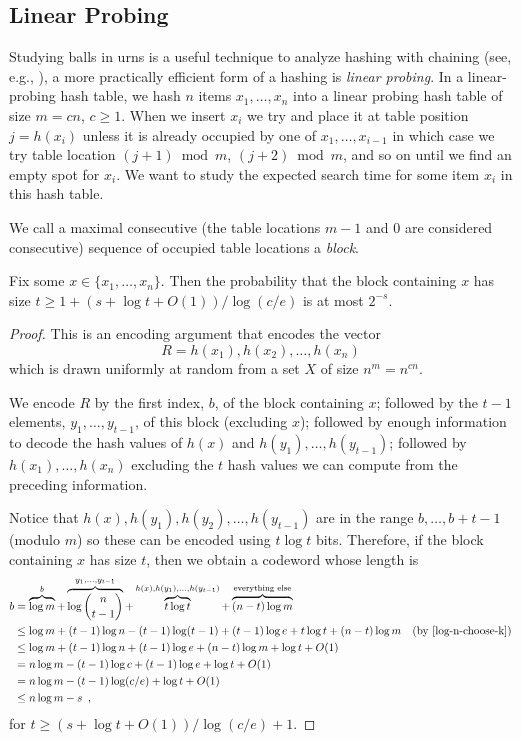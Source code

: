 \documentclass{patmorin}
\begin{document}
\subsection{Linear Probing}

Studying balls in urns is a useful technique to analyze hashing with
chaining (see, e.g., \cite[Section~5.1]{morin:open}), a more practically
efficient form of a hashing is \emph{linear probing}.  In a linear-probing
hash table, we hash $n$ items $x_1,\ldots,x_n$ into a linear probing hash
table of size $m=cn$, $c\ge 1$. When we insert $x_i$ we try and place
it at table position $j=h(x_i)$ unless it is already occupied by one of
$x_1,\ldots,x_{i-1}$ in which case we try table location $(j+1)\bmod m$,
$(j+2)\bmod m$, and so on until we find an empty spot for $x_i$.  We want
to study the expected search time for some item $x_i$ in this hash table.

We call a maximal consecutive (the table locations $m-1$ and
$0$ are considered consecutive) sequence of occupied table locations
a \emph{block}.

\begin{thm}
  Fix some $x\in\{x_1,\ldots,x_n\}$. Then the probability that the block
  containing $x$ has size $t\ge 1+(s+\log t + O(1))/\log(c/e)$ is at most $2^{-s}$.
\end{thm}

\begin{proof}
  This is an encoding argument that encodes the vector 
  \[
     R = h(x_1),h(x_2),\ldots,h(x_n)
  \]
  which is drawn uniformly at random from a set $X$ of size $n^{m}=n^{cn}$.
  
  We encode $R$ by the first index, $b$, of the block containing $x$;
  followed by the $t-1$ elements, $y_1,\ldots,y_{t-1}$, of this block
  (excluding $x$); followed by enough information to decode the hash
  values of $h(x)$ and $h(y_1),\ldots,h(y_{t-1})$; followed by
  $h(x_1),\ldots,h(x_n)$ excluding the $t$ hash values we can compute
  from the preceding information.

  Notice that $h(x),h(y_1),h(y_2),\ldots,h(y_{t-1})$ are in the range
  $b,\ldots,b+t-1$ (modulo $m$) so these can be encoded using $t\log
  t$ bits.  Therefore, if the block containing $x$ has size $t$, then
  we obtain a codeword whose length is
  \begin{align*}
    b & = \overbrace{\log m}^{b} + \overbrace{\log\binom{n}{t-1}}^{y_1,\ldots,y_{t-1}} + \overbrace{t\log t}^{h(x),h(y_1),\ldots,h(y_{t-1})} + \overbrace{(n-t)\log m}^{\text{everything else}} \\
       & \le \log m + (t-1)\log n - 
           (t-1)\log(t-1) + (t-1)\log e + t\log t + (n-t)\log m & \text{(by \eqref{log-n-choose-k})}\\
       & \le \log m + (t-1)\log n + (t-1)\log e + (n-t)\log m + \log t+ O(1)\\
       & = n\log m - (t-1)\log c + (t-1)\log e + \log t + O(1) \\
       & = n\log m - (t-1)\log(c/e) + \log t + O(1) \\
       & \le n\log m - s \enspace ,
  \end{align*}
  for $t\ge (s+\log t+O(1))/\log (c/e) + 1$.
\end{proof}
\end{document}
